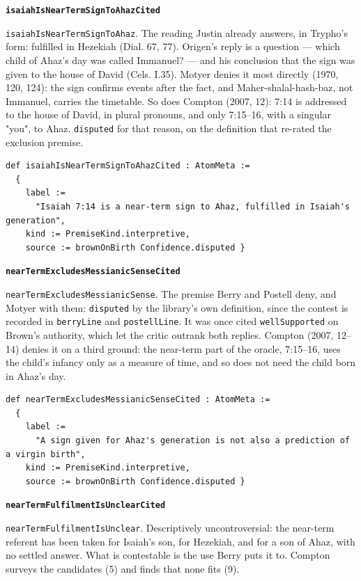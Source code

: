 \documentclass[11pt]{article}
\begin{document}
\par\medskip\noindent\textbf{\texttt{isaiah\allowbreak{}Is\allowbreak{}Near\allowbreak{}Term\allowbreak{}Sign\allowbreak{}To\allowbreak{}Ahaz\allowbreak{}Cited}}\par\nobreak\noindent
\texttt{isaiah\allowbreak{}Is\allowbreak{}Near\allowbreak{}Term\allowbreak{}Sign\allowbreak{}To\allowbreak{}Ahaz}. The reading Justin already answers, in Trypho's form: fulfilled in Hezekiah (Dial. 67, 77). Origen's reply is a question — which child of Ahaz's day was called Immanuel? — and his conclusion that the sign was given to the house of David (Cels. I.35). Motyer denies it most directly (1970, 120, 124): the sign confirms events after the fact, and Maher-shalal-hash-baz, not Immanuel, carries the timetable. So does Compton (2007, 12): 7:14 is addressed to the house of David, in plural pronouns, and only 7:15–16, with a singular "you", to Ahaz. \texttt{disputed} for that reason, on the definition that re-rated the exclusion premise.

{\small\begin{verbatim}
def isaiahIsNearTermSignToAhazCited : AtomMeta :=
  {
    label :=
      "Isaiah 7:14 is a near-term sign to Ahaz, fulfilled in Isaiah's generation",
    kind := PremiseKind.interpretive,
    source := brownOnBirth Confidence.disputed }
\end{verbatim}}
\par\medskip\noindent\textbf{\texttt{near\allowbreak{}Term\allowbreak{}Excludes\allowbreak{}Messianic\allowbreak{}Sense\allowbreak{}Cited}}\par\nobreak\noindent
\texttt{near\allowbreak{}Term\allowbreak{}Excludes\allowbreak{}Messianic\allowbreak{}Sense}. The premise Berry and Postell deny, and Motyer with them: \texttt{disputed} by the library's own definition, since the contest is recorded in \texttt{berry\allowbreak{}Line} and \texttt{postell\allowbreak{}Line}. It was once cited \texttt{well\allowbreak{}Supported} on Brown's authority, which let the critic outrank both replies. Compton (2007, 12–14) denies it on a third ground: the near-term part of the oracle, 7:15–16, uses the child's infancy only as a measure of time, and so does not need the child born in Ahaz's day.

{\small\begin{verbatim}
def nearTermExcludesMessianicSenseCited : AtomMeta :=
  {
    label :=
      "A sign given for Ahaz's generation is not also a prediction of a virgin birth",
    kind := PremiseKind.interpretive,
    source := brownOnBirth Confidence.disputed }
\end{verbatim}}
\par\medskip\noindent\textbf{\texttt{near\allowbreak{}Term\allowbreak{}Fulfilment\allowbreak{}Is\allowbreak{}Unclear\allowbreak{}Cited}}\par\nobreak\noindent
\texttt{near\allowbreak{}Term\allowbreak{}Fulfilment\allowbreak{}Is\allowbreak{}Unclear}. Descriptively uncontroversial: the near-term referent has been taken for Isaiah's son, for Hezekiah, and for a son of Ahaz, with no settled answer. What is contestable is the use Berry puts it to. Compton surveys the candidates (5) and finds that none fits (9).
\end{document}
